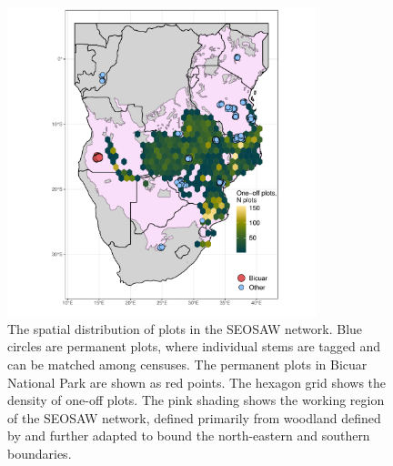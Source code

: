 \begin{refsection}
\begin{figure}[!h]
\centering
	\includegraphics[width=0.8\textwidth]{img/seosaw_plots}
	\caption[Spatial distribution of plots in the SEOSAW network]{The spatial distribution of plots in the SEOSAW network. Blue circles are permanent plots, where individual stems are tagged and can be matched among censuses. The permanent plots in Bicuar National Park are shown as red points. The hexagon grid shows the density of one-off plots.  The pink shading shows the working region of the SEOSAW network, defined primarily from woodland defined by \citet{White1983} and further adapted to bound the north-eastern and southern boundaries.}
	\label{legacy:seosaw_plots}
\end{figure}


\end{refsection}
